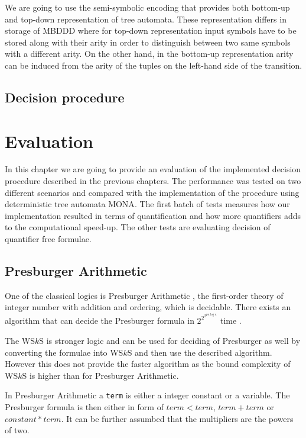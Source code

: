 We are going to use the semi-symbolic encoding that provides both bottom-up and
top-down representation of tree automata. These representation differs in
storage of MBDDD where for top-down representation input symbols have to be
stored along with their arity in order to distinguish between two same symbols
with a different arity. On the other hand, in the bottom-up representation arity
can be induced from the arity of the tuples on the left-hand side of the
transition. 

 \section{Decision procedure}

\chapter{Evaluation}

In this chapter we are going to provide an evaluation of the implemented
decision procedure described in the previous chapters. The performance was
tested on two different scenarios and compared with the implementation of the
procedure using deterministic tree automata \textsc{MONA}. The first batch of
tests measures how our implementation resulted in terms of quantification and
how more quantifiers adds to the computational speed-up. The other tests are
evaluating decision of quantifier free formulae. 

\section{Presburger Arithmetic}

One of the classical logics is Presburger Arithmetic \cite{pres}, the
first-order theory of integer number with addition and ordering, which is
decidable. There exists an algorithm that can decide the Presburger formula in
$2^{2^{2^{pn\log n}}}$ time \cite{pres-time}. 

The WS$k$S is stronger logic and can be used for deciding of Presburger as well
by converting the formulae into WS$k$S and then use the described algorithm.
However this does not provide the faster algorithm as the bound complexity of
WS$k$S is higher than for Presburger Arithmetic. 

In Presburger Arithmetic a \texttt{term} is either a integer constant or a
variable. The Presburger formula is then either in form of $term < term$, $term
+ term$ or $constant * term$. It can be further assumbed that the multipliers
are the powers of two.

